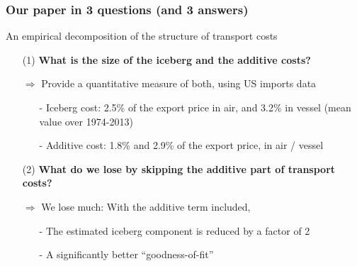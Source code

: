 \documentclass[10 pt,Helvetica, french]{beamer}
\begin{document}
\begin{frame}
\frametitle{Our paper in 3 questions (and 3 answers)}
An empirical decomposition of the structure of transport costs \vspace{0.2cm}
\begin{itemize}
\item[(1)]\textbf{ What is the size of the iceberg and the additive costs?} \vspace{0.1cm}
\item[$\Rightarrow$] Provide a quantitative measure of both, using US imports data \vspace{0.1cm}
\begin{itemize}
\item[-] Iceberg cost: 2.5\% of the export price in air, and 3.2\% in vessel (mean value over 1974-2013) \vspace{0.1cm}
\item[-] Additive cost: 1.8\% and 2.9\% of the export price, in air / vessel  \vspace{0.2cm}
\end{itemize}
\item[(2)] \textbf{ What do we lose by skipping the additive part of transport costs?} \vspace{0.1cm}
\item[$\Rightarrow$] We lose much: With the additive term included, \vspace{0.1cm}
\begin{itemize}
\item[-] The estimated iceberg component is reduced by a factor of 2 \vspace{0.1cm}
\item[-] A significantly better ``goodness-of-fit'' \vspace{0.1cm}
\end{itemize}
\end{itemize}
\end{frame}
\end{document}
